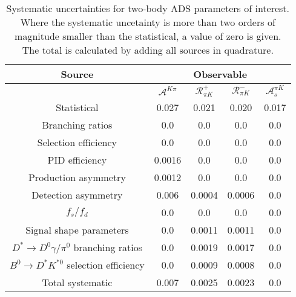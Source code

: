 \begin{sidewaystable}
  \centering
  \begin{tabular}{ccccc}
      \toprule
      Source & \multicolumn{4}{c}{Observable} \\
      \midrule
       & $\mathcal{A}^{K\pi}$ & $\mathcal{R}_{\pi K}^+$ & $\mathcal{R}_{\pi K}^-$ & $\mathcal{A}_s^{\pi K}$ \\
      \midrule
      Statistical & 0.027 & 0.021 & 0.020 & 0.017 \\
      \midrule
      Branching ratios & 0.0  & 0.0  & 0.0  & 0.0  \\
      Selection efficiency & 0.0  & 0.0  & 0.0  & 0.0  \\
      PID efficiency & 0.0016 & 0.0  & 0.0  & 0.0  \\
      Production asymmetry & 0.0012 & 0.0  & 0.0  & 0.0  \\
      Detection asymmetry & 0.006 & 0.0004 & 0.0006 & 0.0  \\
      $f_s/f_d$ & 0.0  & 0.0  & 0.0  & 0.0  \\
      Signal shape parameters & 0.0  & 0.0011 & 0.0011 & 0.0  \\
      $D^* \to D^0 \gamma/\pi^0$ branching ratios & 0.0  & 0.0019 & 0.0017 & 0.0  \\
      $B^0 \to D^* K^{*0}$ selection efficiency & 0.0  & 0.0009 & 0.0008 & 0.0  \\
      \midrule
      Total systematic & 0.007 & 0.0025 & 0.0023 & 0.0 \\
      \bottomrule
  \end{tabular}
  \caption{Systematic uncertainties for two-body ADS parameters of interest. Where the systematic uncetainty is more than two orders of magnitude smaller than the statistical, a value of zero is given. The total is calculated by adding all sources in quadrature.}
\label{tab:twoBody_ADS_systematics}
\end{sidewaystable}

